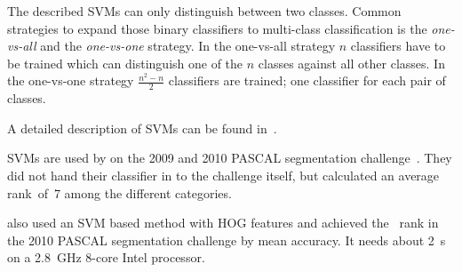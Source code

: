 The described \glspl{SVM} can only distinguish between two classes. Common
strategies to expand those binary classifiers to multi-class classification is
the \textit{one-vs-all} and the \textit{one-vs-one} strategy. In the one-vs-all
strategy $n$ classifiers have to be trained which can distinguish one of the $n$
classes against all other classes. In the one-vs-one strategy $\frac{n^2 - n}{2}$
classifiers are trained; one classifier for each pair of classes.

A detailed description of \glspl{SVM} can be found in~\cite{burges1998tutorial}.

\Glspl{SVM} are used by \cite{yang2012layered} on the 2009 and 2010 PASCAL
segmentation challenge~\cite{everingham2010pascal}. They did not hand their
classifier in to the challenge itself, but calculated an average rank~of~7
among the different categories.

\cite{felzenszwalb2010object} also used an \gls{SVM} based method with \gls{HOG}
features and achieved the ~rank in the 2010 PASCAL segmentation
challenge by mean accuracy. It needs about \SI{2}{\second} on a
\SI{2.8}{\giga\hertz} 8-core Intel processor.
